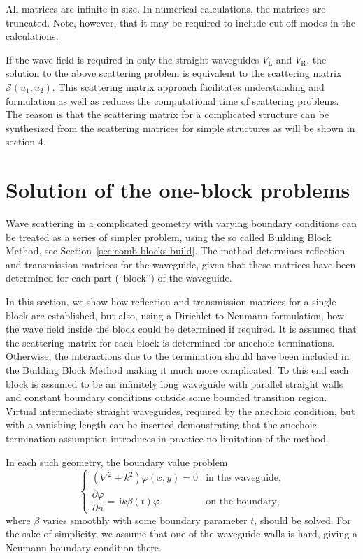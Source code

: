 \documentclass[numreferences]{kluwer}
\renewcommand{\phi}{\varphi}
\renewcommand{\i}{\,\mathrm{i}}
\newcommand{\pd}[2]{\dfrac{\partial#1}{\partial#2}}
\begin{document}
All matrices are infinite in size. In numerical calculations, the
matrices are truncated. Note, however, that it may be required to
include cut-off modes in the calculations.

If the wave field is required in only the straight waveguides
$V_{\text{L}}$ and $V_{\text{R}}$, the solution to the above
scattering problem is equivalent to the scattering matrix
$\mathcal{S}(u_1,u_2)$. This scattering matrix approach facilitates
understanding and formulation as well as reduces the computational
time of scattering problems. The reason is that the scattering matrix
for a complicated structure can be synthesized from the scattering
matrices for simple structures as will be shown in section 4.

\section{Solution of the one-block problems}
\label{sec:oneblock}

Wave scattering in a complicated geometry with varying boundary
conditions can be treated as a series of simpler problem, using the so
called Building Block Method, see
Section~\ref{sec:comb-blocks-build}. The method determines reflection
and transmission matrices for the waveguide, given that these matrices
have been determined for each part (``block'') of the waveguide.

In this section, we show how reflection and transmission matrices for
a single block are established, but also, using a Dirichlet-to-Neumann
formulation, how the wave field inside the block could be determined
if required. It is assumed that the scattering matrix for each block
is determined for anechoic terminations. Otherwise, the interactions
due to the termination should have been included in the Building Block
Method making it much more complicated. To this end each block is
assumed to be an infinitely long waveguide with parallel straight
walls and constant boundary conditions outside some bounded transition
region. Virtual intermediate straight waveguides, required by the
anechoic condition, but with a vanishing length can be inserted
\cite{nilssonbrander1981b} demonstrating that the anechoic termination
assumption introduces in practice no limitation of the method.

In each such geometry, the boundary value problem
\begin{equation}
  \label{eq:bvp1}
  \begin{cases}
    \left(\nabla^2+k^2\right)\phi(x,y)=0&\text{in the waveguide,}\\[1ex]
    \pd \phi n=\i k\beta(t)\phi&\text{on the boundary,}
  \end{cases}
\end{equation}
where $\beta$ varies smoothly with some boundary parameter $t$, should
be solved. For the sake of simplicity, we assume that one of the
waveguide walls is hard, giving a Neumann boundary condition there.
\end{document}
